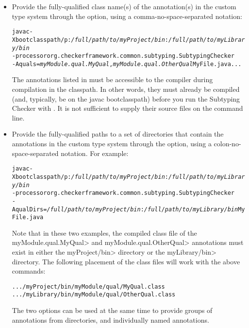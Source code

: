 \begin{itemize}

\item
Provide the fully-qualified class name(s) of the annotation(s) in the custom
type system through the  option, using a comma-no-space-separated
notation:

\begin{alltt}
  javac -Xbootclasspath/p:\textit{/full/path/to/myProject/bin}:\textit{/full/path/to/myLibrary/bin} \ttbs
        -processor org.checkerframework.common.subtyping.SubtypingChecker \ttbs
        -Aquals=\textit{myModule.qual.MyQual},\textit{myModule.qual.OtherQual} MyFile.java ...
\end{alltt}

The annotations listed in  must be accessible to
the compiler during compilation in the classpath.  In other words, they must
already be compiled (and, typically, be on the javac bootclasspath)
before you run the Subtyping Checker with .  It
is not sufficient to supply their source files on the command line.

\item
Provide the fully-qualified paths to a set of directories that contain the
annotations in the custom type system through the  option,
using a colon-no-space-separated notation. For example:

\begin{alltt}
  javac -Xbootclasspath/p:\textit{/full/path/to/myProject/bin}:\textit{/full/path/to/myLibrary/bin} \ttbs
        -processor org.checkerframework.common.subtyping.SubtypingChecker \ttbs
        -AqualDirs=\textit{/full/path/to/myProject/bin}:\textit{/full/path/to/myLibrary/bin} MyFile.java
\end{alltt}

Note that in these two examples, the compiled class file of the
\<myModule.qual.MyQual> and \<myModule.qual.OtherQual> annotations must exist
in either the \<myProject/bin> directory or the \<myLibrary/bin> directory. The
following placement of the class files will work with the above commands:

\begin{alltt}
  .../myProject/bin/myModule/qual/MyQual.class
  .../myLibrary/bin/myModule/qual/OtherQual.class
\end{alltt}

The two options can be used at the same time to provide groups of annotations
from directories, and individually named annotations.

\end{itemize}

